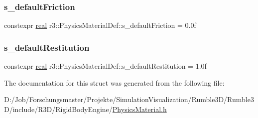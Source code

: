 \mbox{\label{structr3_1_1_physics_material_def_a491a5e29b693bd20a7a8708f13c7f473}} 
\subsubsection{\texorpdfstring{s\+\_\+default\+Friction}{s\_defaultFriction}}
{\footnotesize\ttfamily constexpr \mbox{\hyperlink{namespacer3_ab2016b3e3f743fb735afce242f0dc1eb}{real}} r3\+::\+Physics\+Material\+Def\+::s\+\_\+default\+Friction = 0.\+0f\hspace{0.3cm}{\ttfamily [static]}}

\mbox{\label{structr3_1_1_physics_material_def_a994308068cb88f266dd5f9f63f320add}} 
\subsubsection{\texorpdfstring{s\+\_\+default\+Restitution}{s\_defaultRestitution}}
{\footnotesize\ttfamily constexpr \mbox{\hyperlink{namespacer3_ab2016b3e3f743fb735afce242f0dc1eb}{real}} r3\+::\+Physics\+Material\+Def\+::s\+\_\+default\+Restitution = 1.\+0f\hspace{0.3cm}{\ttfamily [static]}}



The documentation for this struct was generated from the following file\+:\begin{DoxyCompactItemize}
\item 
D\+:/\+Job/\+Forschungsmaster/\+Projekte/\+Simulation\+Visualization/\+Rumble3\+D/\+Rumble3\+D/include/\+R3\+D/\+Rigid\+Body\+Engine/\mbox{\hyperlink{_physics_material_8h}{Physics\+Material.\+h}}\end{DoxyCompactItemize}
